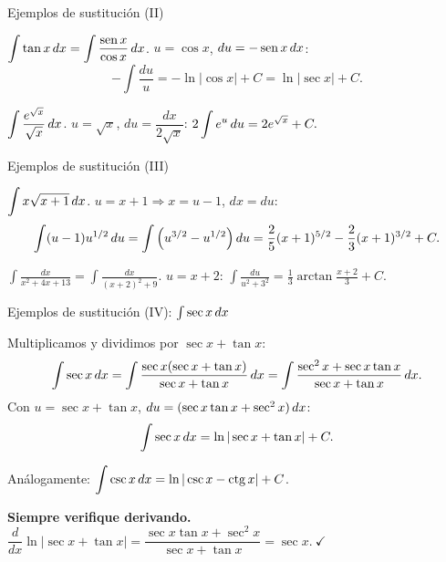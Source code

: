 \documentclass[10pt,aspectratio=169]{beamer}
\begin{document}
\begin{frame}{Ejemplos de sustitución (II)}
  \begin{ejemplo}[3: la forma $f'/f$]
    $\displaystyle\int\tan x\,dx=\int\frac{\operatorname{sen} x}{\cos x}\,dx$. \quad $u=\cos x$, $du=-\operatorname{sen} x\,dx$:
    \[ -\int\frac{du}{u}=-\ln|\cos x|+C=\ln|\sec x|+C. \]
  \end{ejemplo}
  \begin{ejemplo}[4]
    $\displaystyle\int\frac{e^{\sqrt x}}{\sqrt x}\,dx$. \quad $u=\sqrt x$, $du=\dfrac{dx}{2\sqrt x}$:
    \quad $2\displaystyle\int e^u\,du=2e^{\sqrt x}+C.$
  \end{ejemplo}
\end{frame}

\begin{frame}{Ejemplos de sustitución (III)}
  \begin{ejemplo}[5: despejar $x$]
    $\displaystyle\int x\sqrt{x+1}\,dx$. \quad $u=x+1\Rightarrow x=u-1$, $dx=du$:
    \[ \int(u-1)u^{1/2}\,du=\int\left(u^{3/2}-u^{1/2}\right)du
       =\frac25(x+1)^{5/2}-\frac23(x+1)^{3/2}+C. \]
  \end{ejemplo}
  \begin{ejemplo}
    $\displaystyle\int\frac{dx}{x^2+4x+13}=\int\frac{dx}{(x+2)^2+9}$. \quad $u=x+2$:
    \quad $\displaystyle\int\frac{du}{u^2+3^2}=\frac13\arctan\frac{x+2}{3}+C.$
  \end{ejemplo}
\end{frame}

\begin{frame}{Ejemplos de sustitución (IV): $\int\sec x\,dx$}
  \begin{ejemplo}
    Multiplicamos y dividimos por $\sec x+\tan x$:
    \[
      \int\sec x\,dx=\int\frac{\sec x(\sec x+\tan x)}{\sec x+\tan x}\,dx
      =\int\frac{\sec^2x+\sec x\tan x}{\sec x+\tan x}\,dx.
    \]
    Con $u=\sec x+\tan x$, $du=(\sec x\tan x+\sec^2x)\,dx$:
    \[ \int\sec x\,dx=\ln|\sec x+\tan x|+C. \]
  \end{ejemplo}
  Análogamente: $\displaystyle\int\operatorname{csc} x\,dx=\ln|\operatorname{csc} x-\operatorname{ctg} x|+C$.
  \begin{observacion}
    \textbf{Siempre verifique derivando.}
    $\dfrac{d}{dx}\ln|\sec x+\tan x|=\dfrac{\sec x\tan x+\sec^2x}{\sec x+\tan x}=\sec x.\ \checkmark$
  \end{observacion}
\end{frame}
\end{document}
